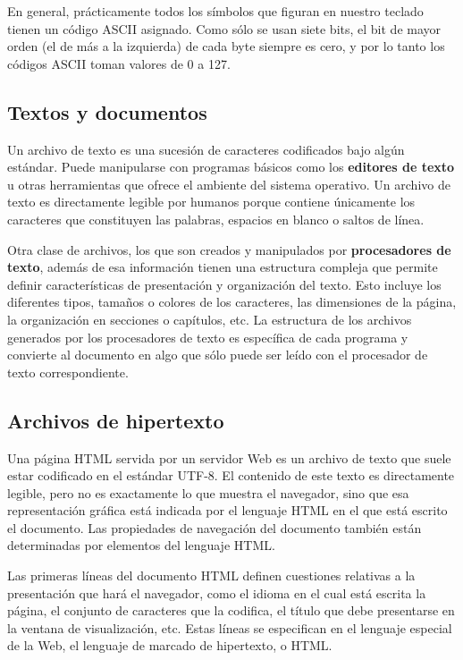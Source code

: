 \documentclass[spanish,A4,]{article}
\begin{document}
En general, prácticamente todos los símbolos que figuran en nuestro
teclado tienen un código ASCII asignado. Como sólo se usan siete bits,
el bit de mayor orden (el de más a la izquierda) de cada byte siempre es
cero, y por lo tanto los códigos ASCII toman valores de 0 a 127.

\subsection{Textos y documentos}\label{textos-y-documentos}

Un archivo de texto es una sucesión de caracteres codificados bajo algún
estándar. Puede manipularse con programas básicos como los
\textbf{editores de texto} u otras herramientas que ofrece el ambiente
del sistema operativo. Un archivo de texto es directamente legible por
humanos porque contiene únicamente los caracteres que constituyen las
palabras, espacios en blanco o saltos de línea.

Otra clase de archivos, los que son creados y manipulados por
\textbf{procesadores de texto}, además de esa información tienen una
estructura compleja que permite definir características de presentación
y organización del texto. Esto incluye los diferentes tipos, tamaños o
colores de los caracteres, las dimensiones de la página, la organización
en secciones o capítulos, etc. La estructura de los archivos generados
por los procesadores de texto es específica de cada programa y convierte
al documento en algo que sólo puede ser leído con el procesador de texto
correspondiente.

\subsection{Archivos de hipertexto}\label{archivos-de-hipertexto}

Una página HTML servida por un servidor Web es un archivo de texto que
suele estar codificado en el estándar UTF-8. El contenido de este texto
es directamente legible, pero no es exactamente lo que muestra el
navegador, sino que esa representación gráfica está indicada por el
lenguaje HTML en el que está escrito el documento. Las propiedades de
navegación del documento también están determinadas por elementos del
lenguaje HTML.

Las primeras líneas del documento HTML definen cuestiones relativas a la
presentación que hará el navegador, como el idioma en el cual está
escrita la página, el conjunto de caracteres que la codifica, el título
que debe presentarse en la ventana de visualización, etc. Estas líneas
se especifican en el lenguaje especial de la Web, el lenguaje de marcado
de hipertexto, o HTML.
\end{document}
